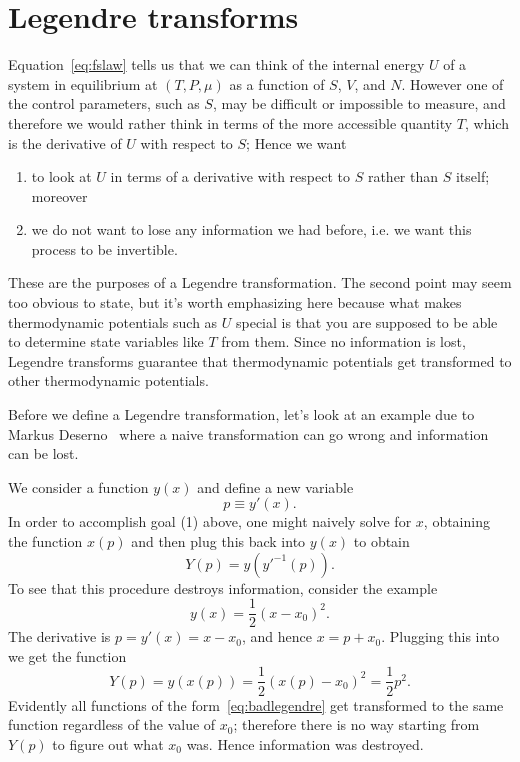 \section{Legendre transforms}

Equation~\eqref{eq:fslaw} tells us that we can think of the internal energy
$U$ of a system in equilibrium at $(T,P,\mu)$ as a function of $S$, $V$, and
$N$. However one of the control parameters, such as $S$, may be
difficult or impossible to measure, and therefore we would rather
think in terms of the more accessible quantity $T$, which 
is the derivative of $U$ with respect to $S$; 
Hence we want 
\begin{enumerate}
\item to look at $U$ in terms of a derivative with respect to $S$ rather 
      than $S$ itself; moreover 
\item we do not want to lose any information we had before, i.e. we want this
      process to be invertible. 
\end{enumerate}
These are the purposes of a Legendre transformation. The second point 
may seem too obvious to state, but it's worth emphasizing here because 
what makes thermodynamic potentials such as $U$ special is that you are 
supposed to be able to determine state variables like $T$ from them. 
Since no information is lost, Legendre transforms guarantee that 
thermodynamic potentials get transformed to other thermodynamic potentials.

Before we define a Legendre transformation, let's look at an example
due to Markus Deserno~\cite{deserno} where a naive transformation can go
wrong and information can be lost. 
\begin{example*}{}
We consider a function $y(x)$ and define a new variable
\begin{equation}\label{eq:xlegendre}
  p\equiv y'(x).
\end{equation}
In order to accomplish goal (1) above, one might naively solve
 for $x$, obtaining the function $x(p)$
and then plug this back into $y(x)$ to obtain
\begin{equation}
  Y(p)=y\left(y'^{-1}(p)\right).
\end{equation}
To see that this procedure destroys information, consider the example
\begin{equation}\label{eq:badlegendre}
  y(x)=\frac{1}{2}(x-x_0)^2.
\end{equation}
The derivative is $p=y'(x)=x-x_0$, and hence $x=p+x_0$. Plugging this
into  we get the function
\begin{equation}
  Y(p)=y(x(p))=\frac{1}{2}\left(x(p)-x_0\right)^2=\frac{1}{2}p^2.
\end{equation}
Evidently all functions of the form~\eqref{eq:badlegendre} get transformed
to the same function regardless of the value of $x_0$; therefore there is
no way starting from $Y(p)$ to figure out what $x_0$ was. Hence
information was destroyed.
\end{example*}

